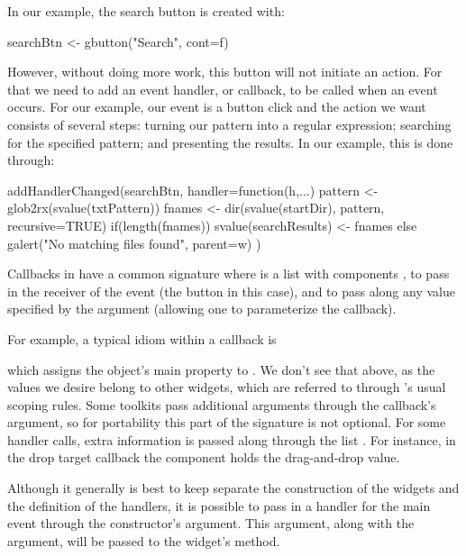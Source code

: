 In our example, the search button is created with:
\begin{Schunk}
\begin{Sinput}
 searchBtn <- gbutton("Search", cont=f)
\end{Sinput}
\end{Schunk}
%
However, without doing more work, this button will not initiate an
action. For that we need to add an event handler, or callback, to be
called when an event occurs. For our example, our event is a button
click and the action we want consists of several steps: turning our
pattern into a regular expression; searching for the specified
pattern; and presenting the results.  In our example, this is done
through:
\begin{Schunk}
\begin{Sinput}
 addHandlerChanged(searchBtn, handler=function(h,...) {
   pattern <- glob2rx(svalue(txtPattern))
   fnames <- dir(svalue(startDir), pattern, recursive=TRUE)
   if(length(fnames))
     svalue(searchResults) <- fnames
   else
     galert("No matching files found", parent=w)
 })
\end{Sinput}
\end{Schunk}
%
Callbacks in  have a common signature 
where  is a list with components , to pass in the
receiver of the event (the button in this case), and  to
pass along any value specified by the  argument (allowing
one to parameterize the callback).

For example, a typical idiom within a callback is
\begin{Schunk}
\end{Schunk}
%
which assigns the object's main property to .  We don't see
that above, as the values we desire belong to other widgets, which are
referred to through \R's usual scoping rules.  Some toolkits pass
additional arguments through the callback's   argument, so
for portability this part of the signature is not optional. For some
handler calls, extra information is passed along through the list
. For instance, in the drop target callback the component
 holds the drag-and-drop value.




Although it generally is best to keep separate the construction of the
widgets and the definition of the handlers, it is possible to pass in
a handler for the main event through the constructor's 
argument. This argument, along with the  argument, will
be passed to the widget's  method. 



